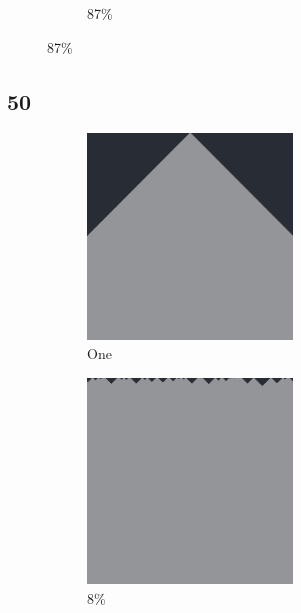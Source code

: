 \documentclass[12pt, fleqn]{report}                             %
\theoremstyle{break}                                            %
\begin{document}
\begin{figure}[ht!]
\begin{subfigure}[b]{0.4\linewidth}
          \caption{87\%}
        \end{subfigure}
      \end{figure}


      \clearpage
      \subsection{50}
      \begin{figure}[ht!]
        \centering
        \begin{subfigure}[b]{0.4\linewidth}
          \includegraphics[width=0.6\textwidth]{Images/50/a.png}
          \caption{One}
        \end{subfigure}
        \begin{subfigure}[b]{0.4\linewidth}
          \includegraphics[width=0.6\textwidth]{Images/50/b.png}
          \caption{8\%}
        \end{subfigure}
        \begin{subfigure}[b]{0.4\linewidth}

\end{subfigure}
\end{figure}
\end{document}
